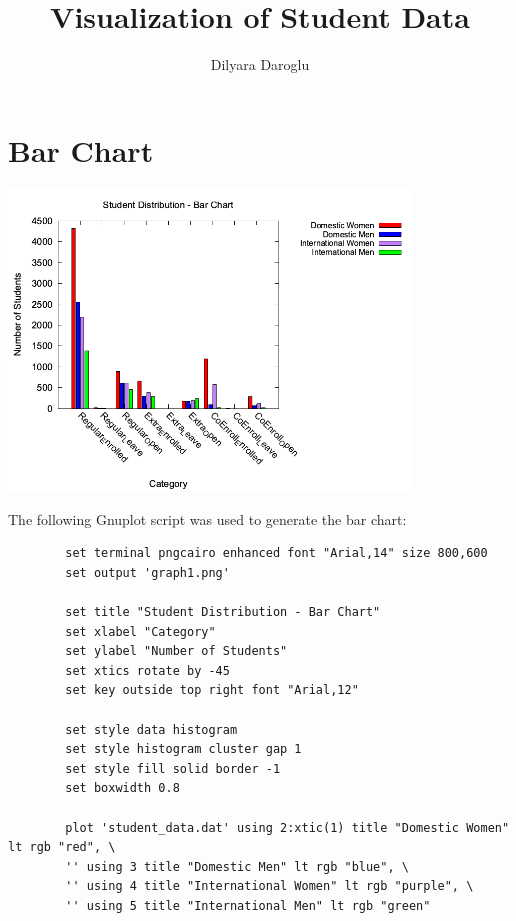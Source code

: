 \documentclass{article}
\begin{document}
	
	\title{Visualization of Student Data}
	\author{Dilyara Daroglu}
	\date{}
	
	\maketitle
	
	\section{Bar Chart}
	\begin{minipage}{\textwidth}
		\centering
		\includegraphics[width=0.8\textwidth]{graph1.png}
		\label{fig:bar}
	\end{minipage}
	
	\vspace{1em}
	
	\noindent The following Gnuplot script was used to generate the bar chart:
	\begin{lstlisting}
		set terminal pngcairo enhanced font "Arial,14" size 800,600
		set output 'graph1.png'
		
		set title "Student Distribution - Bar Chart"
		set xlabel "Category"
		set ylabel "Number of Students"
		set xtics rotate by -45
		set key outside top right font "Arial,12"
		
		set style data histogram
		set style histogram cluster gap 1
		set style fill solid border -1
		set boxwidth 0.8
		
		plot 'student_data.dat' using 2:xtic(1) title "Domestic Women" lt rgb "red", \
		'' using 3 title "Domestic Men" lt rgb "blue", \
		'' using 4 title "International Women" lt rgb "purple", \
		'' using 5 title "International Men" lt rgb "green"
	\end{lstlisting}
	
\end{document}
